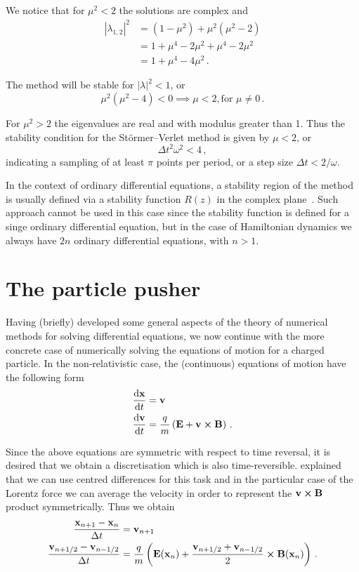 \documentclass[12pt, class=report, crop=false]{standalone}
\begin{document}
We notice that for \(\mu^2 < 2\) the solutions are complex and
\begin{align*}
  |\lambda_{1,2}|^2 &= (1-\mu^2) + \mu^2 (\mu^2-2) \\
  &= 1+\mu^4-2\mu^2+\mu^4-2\mu^2 \\
  &= 1+\mu^4-4\mu^2\,.
\end{align*}

The method will be stable for \(|\lambda|^2 < 1\), or
\[
\mu^2 (\mu^2 - 4) < 0 \implies \mu < 2, \text{for } \mu \ne 0\,.
\]

For \(\mu^2 > 2\) the eigenvalues are real and with modulus greater than 1.
Thus the stability condition for the Störmer–Verlet method is given by \(\mu < 2\),
or
\[
\Delta t^2 \omega^2 < 4\,,
\]
indicating a sampling of at least \(\pi\) points per period, or a step size
\(\Delta t < 2/\omega\).

In the context of ordinary differential equations, a stability region of the method
is usually defined via a stability function \(R(z)\) in the complex
plane~\autocite[81]{butcher_numericalmethods_2016}. Such approach cannot be used
in this case since the stability function is defined for a singe ordinary
differential equation, but in the case of Hamiltonian dynamics we always have
\(2n\) ordinary differential equations, with \(n>1\).

\section{The particle pusher}

Having (briefly) developed some general aspects of the theory of numerical methods
for solving differential equations, we now continue with the more concrete case
of numerically solving the equations of motion for a charged particle.
In the non-relativistic case, the (continuous) equations of motion have the
following form
\begin{align*}
  \dv{\vb{x}}{t} &= \vb{v} \\
  \dv{\vb{v}}{t} &= \frac{q}{m} \left(\vb{E} + \vb{v}\cp\vb{B}\right)\,.
\end{align*}

Since the above equations are symmetric with respect to time reversal, it is
desired that we obtain a discretisation which is also time-reversible.
\Textcite{buneman_timereversibledifference_1967} explained that we can
use centred differences for this task and in the particular case of the
Lorentz force we can average the velocity in order to represent the
\(\vb{v} \cp \vb{B}\) product symmetrically. Thus we obtain
\begin{subequations}
  \begin{align}
    \label{eq:lorentz-discrete-x}
    \frac{\vb{x}_{n+1}-\vb{x}_n}{\Delta t} &= \vb{v}_{n+1} \\
    \label{eq:lorentz-discrete-v}
    \frac{\vb{v}_{n+1/2}-\vb{v}_{n-1/2}}{\Delta t} &= \frac{q}{m}
      \left(\vb{E}(\vb{x}_n) + \frac{\vb{v}_{n+1/2}+\vb{v}_{n-1/2}}{2} \cp \vb{B}(\vb{x}_n)\right)\,.
  \end{align}
\end{subequations}
\end{document}
